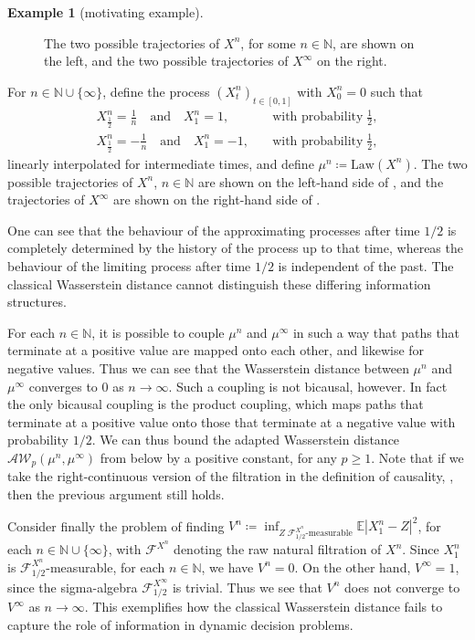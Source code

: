 \documentclass[oneside]{amsart}
\theoremstyle{definition}
\newtheorem{example}[theorem]{Example}
\newcommand{\F}{\mathcal F}
\newcommand{\AW}{\mathcal A\mathcal W}
\newcommand{\Law}{\mathrm{Law}}
\newcommand{\N}{\mathbb N}
\def\E{{\mathbb E}}
\numberwithin{equation}{section}
\begin{document}
	\begin{example}[motivating example]\label{ex:motivation}
		\begin{figure}[h]
		
		\quad
		
		\caption{The two possible trajectories of $X^n$, for some $n \in \N$, are shown on the left, and the two possible trajectories of $X^\infty$ on the right.}\label{fig:motivation}
	\end{figure}
		For $n \in \N \cup \{\infty\}$, define the process $(X^n_t)_{t \in [0, 1]}$ with $X^n_0 = 0$ such that
		\begin{equation}
			\begin{split}
				X^n_{\frac{1}{2}} = \frac{1}{n}\quad\text{and} \quad X^n_1 = 1, &\quad \text{with probability}\; \frac{1}{2},\\
				X^n_{\frac{1}{2}} = -\frac{1}{n} \quad \text{and} \quad X^n_1 = -1, &\quad \text{with probability}\; \frac{1}{2},
			\end{split}
		\end{equation}
		linearly interpolated for intermediate times,
		and define $\mu^n\coloneqq  \Law(X^n)$. The two possible trajectories of $X^n$, $n \in \N$ are shown on the left-hand side of , and the trajectories of $X^\infty$ are shown on the right-hand side of .
		
		One can see that the behaviour of the approximating processes after time $1/2$ is completely determined by the history of the process up to that time, whereas the behaviour of the limiting process after time $1/2$ is independent of the past. The classical Wasserstein distance cannot distinguish these differing information structures.
		
		For each $n \in \N$, it is possible to couple $\mu^n$ and $\mu^\infty$ in such a way that paths that terminate at a positive value are mapped onto each other, and likewise for negative values. Thus we can see that the Wasserstein distance between $\mu^n$ and $\mu^\infty$ converges to $0$ as $n \to \infty$. Such a coupling is not bicausal, however. In fact the only bicausal coupling is the product coupling, which maps paths that terminate at a positive value onto those that terminate at a negative value with probability $1/2$. We can thus bound the adapted Wasserstein distance $\AW_p(\mu^n, \mu^\infty)$ from below by a positive constant, for any $p \geq 1$.
		Note that if we take the right-continuous version of the filtration in the definition of causality, , then the previous argument still holds.
		
		Consider finally the problem of finding $V^n\coloneqq  \inf_{Z \;\F^{X^n}_{1/2}\text{-measurable}}\E|X^n_1 - Z|^2$, for each $n \in \N \cup \{\infty\}$, with $\F^{X^n}$ denoting the raw natural filtration of $X^n$. Since $X^n_1$ is $\F^{X^n}_{1/2}$-measurable, for each $n \in \N$, we have $V^n = 0$. On the other hand, $V^\infty = 1$, since the sigma-algebra $\F^{X^\infty}_{1/2}$ is trivial. Thus we see that $V^n$ does not converge to $V^\infty$ as $n \to \infty$. This exemplifies how the classical Wasserstein distance fails to capture the role of information in dynamic decision problems.
	\end{example}
	
\end{document}
